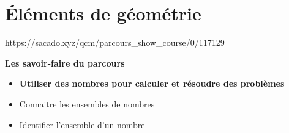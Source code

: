 \chapter{Éléments de géométrie}
{https://sacado.xyz/qcm/parcours_show_course/0/117129}
{


 \begin{CpsCol}
\textbf{Les savoir-faire du parcours}
 \begin{itemize}
 \item \textbf{Utiliser des nombres pour calculer et résoudre des problèmes}
 \item Connaitre les ensembles de nombres
 \item  Identifier l'ensemble d'un nombre
 \end{itemize}
 \end{CpsCol}

}

